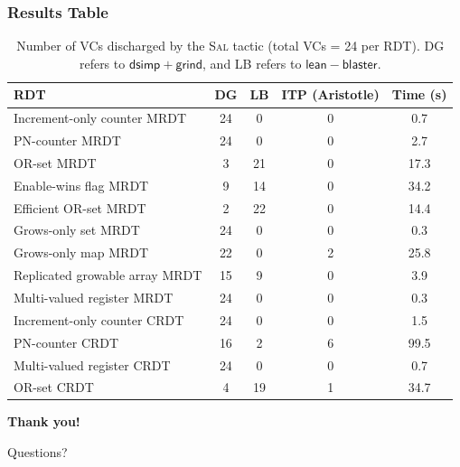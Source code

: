 \documentclass[usepdftitle=false]{beamer}
\newcommand{\sal}{\textsc{Sal}\xspace}
\newcommand{\F}[1]{\mathsf{#1}}
\begin{document}
\begin{frame}
  \frametitle{Results Table}
  
  \small
\begin{table}[t]
\caption{Number of VCs discharged by the \sal tactic (total VCs = 24 per RDT). DG refers to $\F{dsimp + grind}$, and LB refers to $\F{lean-blaster}$. }
\label{tab:results_1}
\centering
\footnotesize
\begin{tabular}{lcccc}
\toprule
\textbf{RDT} &
\textbf{DG} &
\textbf{LB} &
\textbf{ITP (Aristotle)} &
\textbf{Time (s)} \\
\midrule
Increment-only counter MRDT    & 24 & 0  & 0 & 0.7  \\
PN-counter MRDT                & 24 & 0  & 0 & 2.7  \\
OR-set MRDT                    & 3  & 21 & 0 & 17.3 \\
Enable-wins flag MRDT   & 9  & 14 & 0 & 34.2 \\
Efficient OR-set MRDT          & 2  & 22 & 0 & 14.4 \\
Grows-only set MRDT            & 24 & 0  & 0 & 0.3  \\
Grows-only map MRDT            & 22 & 0  & 2 & 25.8 \\
Replicated growable array MRDT & 15 & 9  & 0 & 3.9  \\
Multi-valued register MRDT     & 24 & 0  & 0 & 0.3  \\
Increment-only counter CRDT    & 24 & 0  & 0 & 1.5  \\
PN-counter CRDT                & 16 & 2  & 6 & 99.5 \\
Multi-valued register CRDT     & 24 & 0  & 0 & 0.7  \\
OR-set CRDT                    & 4  & 19 & 1 & 34.7 \\
\bottomrule
\end{tabular}
\end{table}
\end{frame}

\begin{frame}
  
  \vspace{0.5cm}
  \centering
  \Large\textbf{Thank you!}
  
  \vspace{0.3cm}
  \normalsize Questions?
\end{frame}
\end{document}
